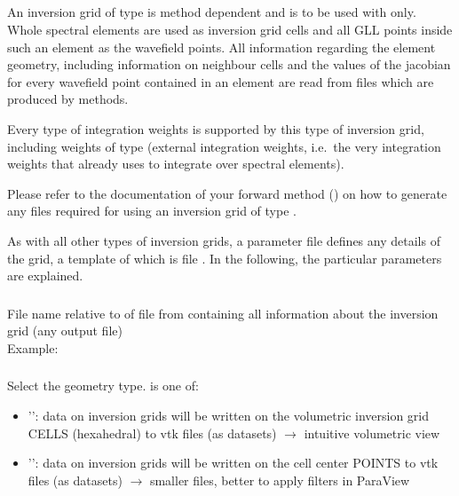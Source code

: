 \subsection{} \label{basic_steps,sec:invgrid,sub:specfem3d}
%
An inversion grid of type  is method dependent and is to be used with 
 only. Whole spectral elements are used as inversion grid cells and all 
GLL points inside such an element as the wavefield points. All information regarding the element 
geometry, including information on neighbour cells and the values of the jacobian for every wavefield 
point contained in an element are read from files which are produced by  methods.

Every type of integration weights is supported by this type of inversion grid, including weights of type 
 (external integration weights, i.e.\ the very integration weights that already 
uses to integrate over spectral elements).

Please refer to the documentation of your  forward method ()
on how to generate any files required for using an inversion grid of type .

As with all other types of inversion grids, a parameter file defines any details of the grid, a template 
of which is file .
In the following, the particular parameters are explained.

\subsubsection{}
File name relative to  of file from 
containing all information about the inversion grid (any  output file)\\
Example:\\
\subsubsection{}
Select the geometry type.  is one of:
\begin{itemize}
\item[]'': data on inversion grids will be written on the volumetric inversion grid CELLS (hexahedral) to vtk files (as  datasets) $\rightarrow$ intuitive volumetric view
\item[]'': data on inversion grids will be written on the cell center POINTS to vtk files (as  datasets) $\rightarrow$ smaller files, better to apply filters in ParaView
\end{itemize}
